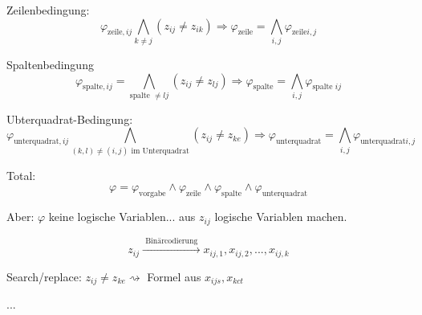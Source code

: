 Zeilenbedingung: \[
	\varphi_{\text{zeile}, ij}   \bigwedge_{k \neq j} (z_{ij} \neq z_{ik}) \Rightarrow \varphi_\text{zeile} = \bigwedge_{i,j} \varphi_{\text{zeile} i,j}
\]

Spaltenbedingung \[
	\varphi_{\text{spalte}, ij} = \bigwedge_{\text{spalte }\neq lj} (z_{ij} \neq z_{lj}) \Rightarrow \varphi_\text{spalte} = \bigwedge_{i,j} \varphi_{\text{spalte } ij}
\]


Ubterquadrat-Bedingung: \[
\varphi_{\text{unterquadrat}, ij}   \bigwedge_{(k,l) \neq (i,j) \text{ im Unterquadrat}} (z_{ij} \neq z_{ke}) \Rightarrow \varphi_\text{unterquadrat} = \bigwedge_{i,j} \varphi_{\text{unterquadrat} i,j}
\]


Total: \[
	\varphi = \varphi_\text{vorgabe} \land  \varphi_\text{zeile} \land  \varphi_\text{spalte} \land  \varphi_\text{unterquadrat} 
\]

Aber: $\varphi$ keine logische Variablen... aus $z_{ij}$ logische Variablen machen.

\[
	z_{ij} \xrightarrow{\text{ Binärcodierung }} x_{ij,1}, x_{ij,2},  ..., x_{ij,k}
	\]
	
Search/replace: $z_{ij} \neq z_{ke} \rightsquigarrow$ Formel aus $x_{ijs}, x_{kct}$




...





